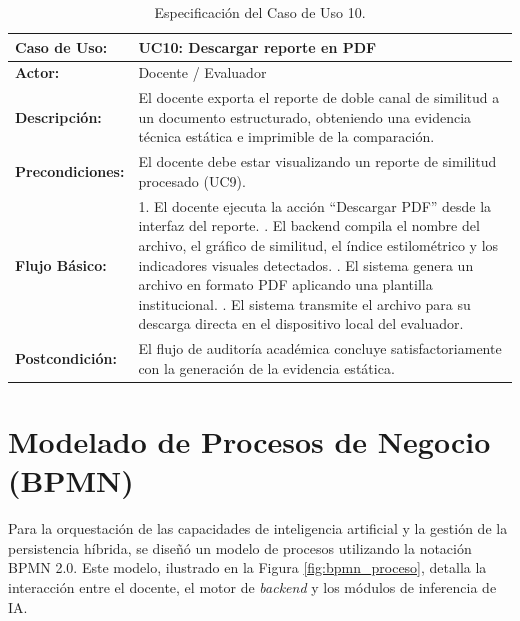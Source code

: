 \begin{table}[H]
	\centering
	\begin{tabular}{|p{3cm}|p{11cm}|}
		\hline
		\rowcolor[HTML]{E7F3FF}
		\textbf{Caso de Uso:}    & \textbf{UC10: Descargar reporte en PDF}                                                                                                                          \\ \hline
		\textbf{Actor:}          & Docente / Evaluador                                                                                                                                              \\ \hline
		\textbf{Descripción:}    & El docente exporta el reporte de doble canal de similitud a un documento estructurado, obteniendo una evidencia técnica estática e imprimible de la comparación. \\ \hline
		\textbf{Precondiciones:} & El docente debe estar visualizando un reporte de similitud procesado (UC9).                                                                                      \\ \hline
		\textbf{Flujo Básico:}   &
		1. El docente ejecuta la acción ``Descargar PDF'' desde la interfaz del reporte. \newline
		2. El backend compila el nombre del archivo, el gráfico de similitud, el índice estilométrico y los indicadores visuales detectados. \newline
		3. El sistema genera un archivo en formato PDF aplicando una plantilla institucional. \newline
		4. El sistema transmite el archivo para su descarga directa en el dispositivo local del evaluador.                                                                                          \\ \hline
		\textbf{Postcondición:}  & El flujo de auditoría académica concluye satisfactoriamente con la generación de la evidencia estática.                                                          \\ \hline
	\end{tabular}
	\caption{Especificación del Caso de Uso 10.}
\end{table}

\section{Modelado de Procesos de Negocio (BPMN)}

Para la orquestación de las capacidades de inteligencia artificial y la gestión de la persistencia híbrida, se diseñó un modelo de procesos utilizando la notación BPMN 2.0. Este modelo, ilustrado en la Figura \ref{fig:bpmn_proceso}, detalla la interacción entre el docente, el motor de \textit{backend} y los módulos de inferencia de IA.

